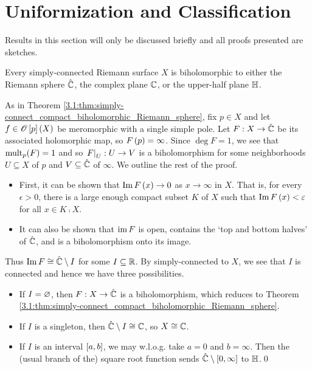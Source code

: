 \documentclass[../Moduli_Spaces_of_Riemann_Surfaces.tex]{subfiles}
\begin{document}
    \section{Uniformization and Classification}\label{sec:uniformization}
    Results in this section will only be discussed briefly and all proofs presented are sketches.
    \begin{theorem}[Uniformization]
        Every simply-connected Riemann surface $X$ is biholomorphic to either the Riemann sphere $\RS$, the complex plane $\C$, or the upper-half plane $\H$.
    \end{theorem}
    \begin{proofsketch}
        As in Theorem \ref{3.1:thm:simply-connect_compact_biholomorphic_Riemann_sphere}, fix $p\in X$ and let $f\in\HOLO\l[p\r]\l(X\r)$ be meromorphic with a single simple pole. Let $F:X\to\RS$ be its associated holomorphic map, so $F\l(p\r)=\infty$. Since $\deg F=1$, we see that $\mult_p\!\l(F\r)=1$ and so $\l.F\r|_U:U\to V$ is a biholomorphism for some neighborhoods $U\subseteq X$ of $p$ and $V\subseteq\RS$ of $\infty$. We outline the rest of the proof.
        \begin{itemize}
            \item First, it can be shown that $\Im F\l(x\r)\to0$ as $x\to\infty$ in $X$. That is, for every $\epsilon>0$, there is a large enough compact subset $K$ of $X$ such that $\Im F\l(x\r)<\epsilon$ for all $x\in K\comp X$.
            \item It can also be shown that $\im F$ is open, contains the `top and bottom halves' of $\RS$, and is a biholomorphism onto its image.
        \end{itemize}
        Thus $\Im F\iso\RS\comp I$ for some $I\subseteq\R$. By simply-connected to $X$, we see that $I$ is connected and hence we have three possibilities.
        \begin{itemize}
            \item If $I=\em$, then $F:X\to\RS$ is a biholomorphism, which reduces to Theorem \ref{3.1:thm:simply-connect_compact_biholomorphic_Riemann_sphere}.
            \item If $I$ is a singleton, then $\RS\comp I\iso\C$, so $X\iso\C$.
            \item If $I$ is an interval $\l[a,b\r]$, we may w.l.o.g. take $a=0$ and $b=\infty$. Then the (usual branch of the) square root function sends $\RS\comp\l[0,\infty\r]$ to $\H$.\qed
        \end{itemize}
    \end{proofsketch}
\end{document}
